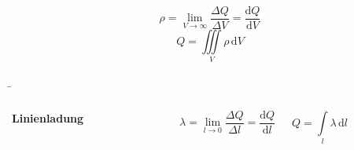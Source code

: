 \begin{frame}
{\begin{figure}[ht]
	\end{figure}
	
	

	\begin{equation*}
		\rho = \lim \limits_{V \to \infty} \frac{\Delta Q}{\Delta V} = \frac{\mathrm{d}Q}{\mathrm{d}V}
	\end{equation*}
	\begin{equation*}
		Q = \iiint\limits_V \rho \, \mathrm{d}V
	\end{equation*}	

	
	}

	\b{
	\begin{columns}
		
				\textbf{Linienladung}
				\vspace{20pt}
				\begin{figure}[h!]
					\centering
				
				{}

					
				\end{figure}	
			
			\vspace{10pt}
				 
				\begin{equation*}
				\lambda = \lim \limits_{l \to 0} \frac{\Delta Q}{\Delta l} = \frac{\mathrm{d}Q}{\mathrm{d}l}
			\end{equation*}
			
			\begin{equation*}
				Q = \int\limits_l \lambda \, \mathrm{d}l
			\end{equation*}
			

			\rule{.1mm}{0.7\textheight}


		\vspace{2pt}
	
\end{columns}}
\end{frame}
